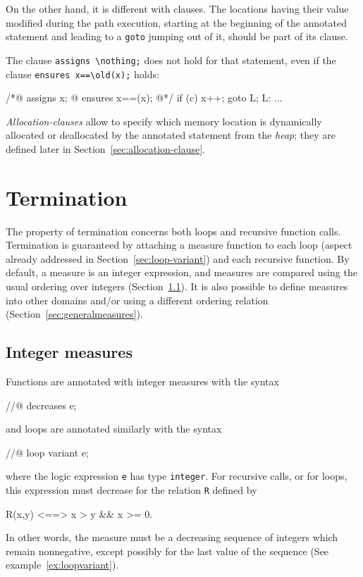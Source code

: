On the other hand, it is different with \assigns{} clauses.
The locations having their value modified during the path execution, starting
at the beginning of the annotated statement and leading
to a \lstinline|goto| jumping out of it, should be part of its 
\assigns clause.

\begin{example} The clause \lstinline|assigns \nothing;| does not hold for that statement,
even if the clause \lstinline|ensures x==\old(x);| holds: 
\begin{listing}{1}
/*@ assigns x;
  @ ensures x==\old(x);
  @*/
  if (c) {
    x++;
    goto L;
  }
L: ...
\end{listing}
\end{example}

\textsl{Allocation-clauses} allow to specify which memory location 
is dynamically allocated or deallocated by the annotated statement from the \textsl{heap}; 
they are defined later in Section~\ref{sec:allocation-clause}.


\section{Termination}
\label{sec:termination}
The property of termination concerns both loops and recursive function
calls.
Termination is guaranteed by attaching a measure function to each loop
(aspect already addressed in Section~\ref{sec:loop-variant}) 
and each recursive function.
By default, a measure is an
integer expression, and measures are compared using the usual ordering
over integers (Section~\ref{sec:integermeasures}). It is also possible
to define
measures into other domains and/or using a different ordering relation
(Section~\ref{sec:generalmeasures}).

\subsection{Integer measures}
\label{sec:integermeasures}
Functions are annotated with integer measures with the syntax
\begin{listing-nonumber}
//@ decreases e;
\end{listing-nonumber}
and loops are annotated similarly with the syntax
\begin{listing-nonumber}
//@ loop variant e;
\end{listing-nonumber}
where the logic expression \lstinline|e| has type
\lstinline|integer|.
For recursive calls, or for loops, this expression must decrease for
the
relation \lstinline|R| defined by
\begin{listing-nonumber}
R(x,y) <==> x > y && x >= 0.
\end{listing-nonumber}
In other words, the measure must be a decreasing sequence of integers
which remain nonnegative, except possibly for the last value of the
sequence (See example~\ref{ex:loopvariant}).

